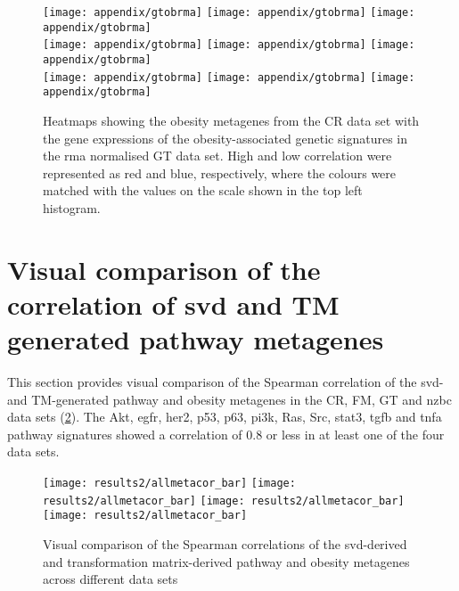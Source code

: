 	\begin{figure}[htp!]
		\centering
		\texttt{[image: appendix/gtobrma]}
		\texttt{[image: appendix/gtobrma]}
		\texttt{[image: appendix/gtobrma]}\\
		\texttt{[image: appendix/gtobrma]}
		\texttt{[image: appendix/gtobrma]}
		\texttt{[image: appendix/gtobrma]}\\
		\texttt{[image: appendix/gtobrma]}
		\texttt{[image: appendix/gtobrma]}
		\texttt{[image: appendix/gtobrma]}\\
		\caption[Heatmaps of all the obesity and the pathway metagenes in the CR, \gls{nzbc} and FM data]{Heatmaps showing the obesity metagenes from the CR data set with the gene expressions of the obesity-associated genetic signatures in the \gls{rma} normalised GT data set.
		High and low correlation were represented as red and blue, respectively, where the colours were matched with the values on the scale shown in the top left histogram.}
		\label{fig:appendix/ob_meta_dir_gt}
	\end{figure}

	\newpage

	\section{Visual comparison of the correlation of \gls{svd} and TM generated pathway metagenes}
	\label{sec:comparison_of_the_correlation_of_svd_and_tm_generated_pathway_metagenes}

	This section provides visual comparison of the Spearman correlation of the \gls{svd}- and TM-generated pathway and obesity metagenes in the CR, FM, GT and \gls{nzbc} data sets (\cref{fig:allmetacor_bar_appendix}).
	The Akt, \gls{egfr}, \gls{her2}, p53, p63, \gls{pi3k}, Ras, Src, \gls{stat3}, \gls{tgfb} and \gls{tnfa} pathway signatures showed a correlation of 0.8 or less in at least one of the four data sets.

	\begin{figure}[htpb]
		\centering
		\texttt{[image: results2/allmetacor\_bar]}
		\texttt{[image: results2/allmetacor\_bar]}
		\texttt{[image: results2/allmetacor\_bar]}
		\texttt{[image: results2/allmetacor\_bar]}\\
		\caption[Bar plots showing the Spearman correlation of the \gls{svd}- and TM-derived obesity and pathway metagenes across different data sets]{Visual comparison of the Spearman correlations of the \gls{svd}-derived and transformation matrix-derived pathway and obesity metagenes across different data sets}
		\label{fig:allmetacor_bar_appendix}
	\end{figure}

